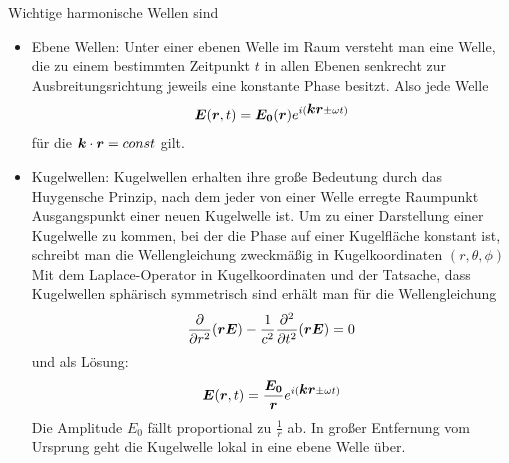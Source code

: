 \documentclass[12pt]{article}
\renewcommand*\vec[1]{{\mbox{\boldmath\ensuremath{#1}}}}
\begin{document}
Wichtige harmonische Wellen sind
\begin{itemize}
 \item Ebene Wellen: Unter einer ebenen Welle im Raum versteht man eine Welle, die zu einem
     bestimmten Zeitpunkt $t$ in allen Ebenen senkrecht zur Ausbreitungsrichtung jeweils eine
     konstante Phase besitzt. Also jede Welle
    \begin{align}
      \vec{E}(\vec{r},t) = \vec{E_0}(\vec{r}) e^{i(\vec k \vec r \pm \omega t)}
    \end{align}
    für die $\vec k\cdot \vec r = const$ gilt.

 \item Kugelwellen: Kugelwellen erhalten ihre große Bedeutung durch das Huygensche Prinzip,
     nach dem jeder von einer Welle erregte Raumpunkt Ausgangspunkt einer neuen Kugelwelle ist.
    Um zu einer Darstellung einer Kugelwelle zu kommen, bei der die Phase auf
     einer Kugelfläche konstant ist, schreibt man die Wellengleichung zweckmäßig in Kugelkoordinaten $(r, \theta, \phi)$
     Mit dem Laplace-Operator in Kugelkoordinaten und der Tatsache, dass Kugelwellen
     sphärisch symmetrisch sind erhält man für die Wellengleichung
    \begin{align}
     \frac{\partial}{\partial r^2} (\vec r \vec E ) - \frac{1}{c^2} \frac{\partial^2}{\partial t^2} (\vec r \vec E) = 0
    \end{align}
    und als Lösung:
    \begin{align}
      \vec{E}(\vec{r},t) = \frac{\vec{E_0}}{\vec{r}} e^{i(\vec k \vec r \pm \omega t)}
    \end{align}
     Die Amplitude $E_0$ fällt proportional zu $\frac{1}{r}$ ab. In großer Entfernung vom Ursprung geht
     die Kugelwelle lokal in eine ebene Welle über.
\end{itemize}
\end{document}
